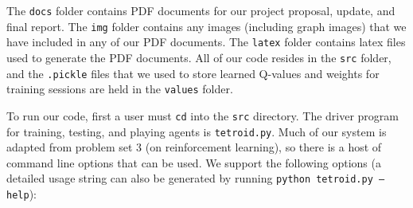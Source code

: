 \documentclass[11pt]{article}
\begin{document}
\bigskip


\bigskip

The \texttt{docs} folder contains PDF documents for our project proposal, update, and final report. The \texttt{img} folder contains any images (including graph images) that we have included in any of our PDF documents. The \texttt{latex} folder contains latex files used to generate the PDF documents. All of our code resides in the \texttt{src} folder, and the \texttt{.pickle} files that we used to store learned Q-values and weights for training sessions are held in the \texttt{values} folder.

\bigskip

To run our code, first a user must \texttt{cd} into the \texttt{src} directory. The driver program for training, testing, and playing agents is \texttt{tetroid.py}. Much of our system is adapted from problem set 3 (on reinforcement learning), so there is a host of command line options that can be used. We support the following options (a detailed usage string can also be generated by running \texttt{python tetroid.py --help}):
\end{document}
